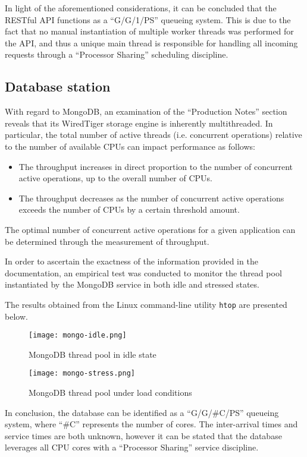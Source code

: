 In light of the aforementioned considerations, it can be concluded that the RESTful API functions as a ``G/G/1/PS'' queueing system.
This is due to the fact that no manual instantiation of multiple worker threads was performed for the API, and thus a unique main thread is responsible for handling all incoming requests through a ``Processor Sharing'' scheduling discipline.

\subsection{Database station}

With regard to MongoDB, an examination of the ``Production Notes'' section reveals that its WiredTiger storage engine is inherently multithreaded.
In particular, the total number of active threads (i.e. concurrent operations) relative to the number of available CPUs can impact performance as follows:

\begin{itemize}
	\item The throughput increases in direct proportion to the number of concurrent active operations, up to the overall number of CPUs.
	\item The throughput decreases as the number of concurrent active operations exceeds the number of CPUs by a certain threshold amount.
\end{itemize}

The optimal number of concurrent active operations for a given application can be determined through the measurement of throughput.

In order to ascertain the exactness of the information provided in the documentation, an empirical test was conducted to monitor the thread pool instantiated by the MongoDB service in both idle and stressed states.

The results obtained from the Linux command-line utility \verb|htop| are presented below.

\begin{figure}[h]
    \centering
    \texttt{[image: mongo-idle.png]}
    \caption{MongoDB thread pool in idle state}
\end{figure}

\begin{figure}[h]
	\centering
	\texttt{[image: mongo-stress.png]}
	\caption{MongoDB thread pool under load conditions}
\end{figure}	

In conclusion, the database can be identified as a ``G/G/\#C/PS'' queueing system, where ``\#C'' represents the number of cores.
The inter-arrival times and service times are both unknown, however it can be stated that the database leverages all CPU cores with a ``Processor Sharing'' service discipline.
